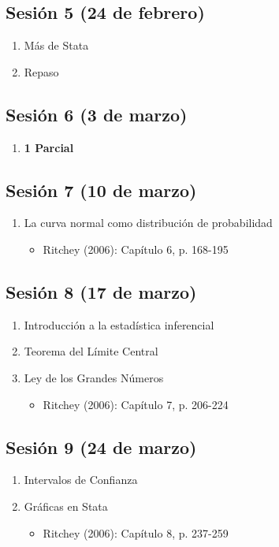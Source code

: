 \documentclass[letterpaper]{article}
\begin{document}
\subsection{Sesión 5 (24 de febrero)}
\begin{enumerate}
\item Más de Stata
\item Repaso
\end{enumerate}

\subsection{Sesión 6 (3 de marzo)}
\begin{enumerate}
\item {\bf 1 Parcial}
\end{enumerate}

\subsection{Sesión 7 (10 de marzo)}
\begin{enumerate}
	\item La curva normal como distribución de probabilidad


\begin{itemize}
	\item Ritchey (2006):
	Capítulo 6, p.
	168-195
\end{itemize}

\end{enumerate}

\subsection{Sesión 8 (17 de marzo)}
\begin{enumerate}
\item Introducción a la
estadística inferencial
\item Teorema del Límite Central
\item Ley de los Grandes Números
\begin{itemize}
	\item Ritchey (2006):
	Capítulo 7, p.
	206-224
\end{itemize}
\end{enumerate}

\subsection{Sesión 9 (24 de marzo)}
\begin{enumerate}
\item Intervalos de Confianza
\item Gráficas en Stata
\begin{itemize}
	\item Ritchey (2006):
	Capítulo 8, p.
	237-259
	
\end{itemize}
\end{enumerate}
\end{document}
